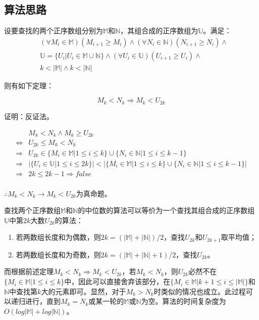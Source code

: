

\subsection{算法思路}

设要查找的两个正序数组分别为$\mathbb M$和$\mathbb N$，其组合成的正序数组为$\mathbb U$。满足：
$$
\begin{aligned}
    &(\forall M_i\in\mathbb M)(M_{i+1}\geq M_i)\wedge(\forall N_i\in\mathbb N)(N_{i+1}\geq N_i)\wedge\\
    &\mathbb U=\{U_i|U_i\in\mathbb M\cup\mathbb N\}\wedge(\forall U_i\in\mathbb U)(U_{i+1}\geq U_i)\wedge\\
    &k<|\mathbb M|\wedge k<|\mathbb N|
\end{aligned}
$$

则有如下定理：

$$
M_k<N_k\Rightarrow M_k<U_{2k}
$$

证明：反证法。

$$
\begin{aligned}
    &M_k<N_k\wedge M_k\geq U_{2k}\\
    \Leftrightarrow& U_{2k}\leq M_k<N_k\\
    \Rightarrow& U_{2k}\in\{M_i\in\mathbb{M}|1\leq i\leq k\}\cup\{N_i\in\mathbb{N}|1\leq i\leq k-1\}\\
    \Rightarrow &|\{U_i\in\mathbb{U}|1\leq i\leq 2k\}|<|\{M_i\in\mathbb{M}|1\leq i\leq k\}\cup\{N_i\in\mathbb{N}|1\leq i\leq k-1\}|\\
    \Rightarrow &2k\leq 2k-1\Rightarrow false\\
\end{aligned}
$$

$\therefore M_k<N_k\rightarrow M_k<U_{2k}$为真命题。

查找两个正序数组$\mathbb M$和$\mathbb N$的中位数的算法可以等价为一个查找其组合成的正序数组$\mathbb U$中第$2k$大数$U_{2k}$的算法：
\begin{enumerate}
    \item 若两数组长度和为偶数，则$2k=(|\mathbb M|+|\mathbb N|)/2$，查找$U_{2k}$和$U_{2k+1}$取平均值；
    \item 若两数组长度和为奇数，则$2k=(|\mathbb M|+|\mathbb N|+1)/2$，查找$U_{2k}$。
\end{enumerate}

而根据前述定理$M_k<N_k\Rightarrow M_k<U_{2k}$，若$M_k<N_k$，则$U_{2k}$必然不在$\{M_i\in\mathbb{M}|1\leq i\leq k\}$中，因此可以直接舍弃该部分，在$\{M_i\in\mathbb{M}|k+1\leq i\leq |\mathbb M|\}$和$\mathbb N$中查找第$k$大的元素即可。显然，对于$M_k>N_k$时类似的情况也成立。此过程可以递归进行，直到$M_k=N_k$或某一轮的$\mathbb{M}$或$\mathbb{N}$为空。算法的时间复杂度为$O(log|\mathbb M|+log|\mathbb N|)$。

